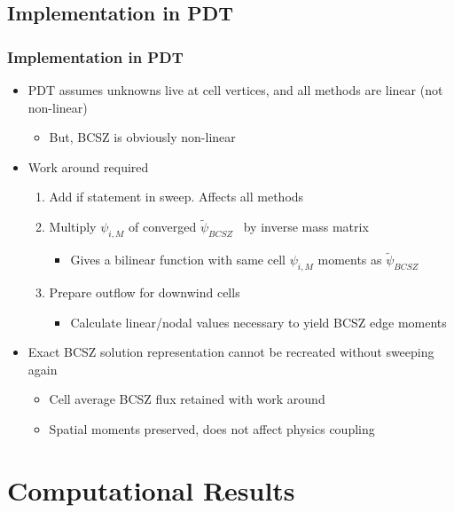 \documentclass{beamer}
\newcommand{\BCSZ}{\ensuremath{\widetilde{\psi}_{BCSZ}}}
\begin{document}
\subsection{Implementation in PDT}
\begin{frame}
\frametitle{Implementation in PDT}

\begin{itemize}
\item PDT assumes unknowns live at cell vertices, and all methods are linear (not non-linear)
\begin{itemize}
\item But, BCSZ is obviously non-linear
\end{itemize}
\item Work around required
\begin{enumerate}
\item Add if statement in sweep.  Affects all methods
\item Multiply $\psi_{i,M}$ of converged \BCSZ~ by inverse mass matrix
\begin{itemize}
\item Gives a bilinear function with same cell $\psi_{i,M}$ moments as \BCSZ
\end{itemize}
\item Prepare outflow for downwind cells
\begin{itemize}
\item Calculate linear/nodal values necessary to yield BCSZ edge moments 
\end{itemize}
\end{enumerate}
\item Exact BCSZ solution representation cannot be recreated without sweeping again
\begin{itemize}
\item Cell average BCSZ flux retained with work around
\item Spatial moments preserved, does not affect physics coupling
\end{itemize}
\end{itemize}
\end{frame}


\section{Computational Results}
\end{document}
